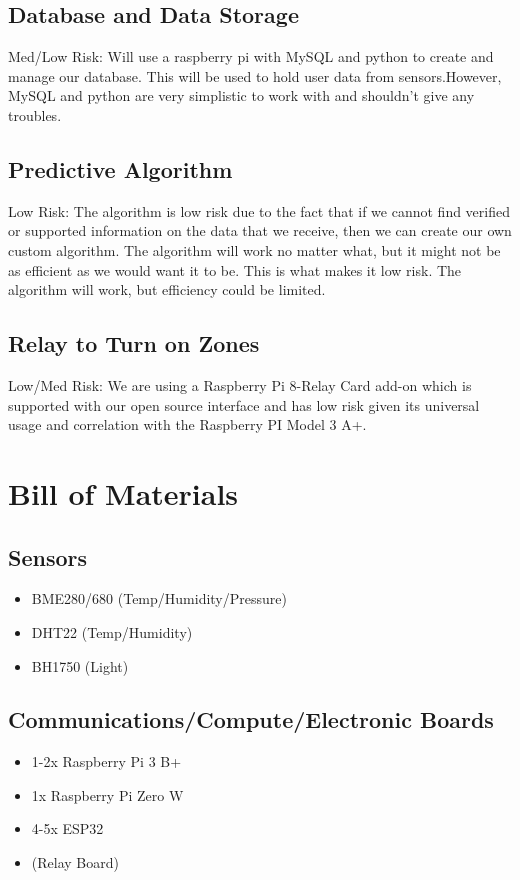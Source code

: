 \documentclass[letterpaper, 10 pt, conference]{ieeeconf}  %
\begin{document}
\subsection{Database and Data Storage}
Med/Low Risk: Will use a raspberry pi with MySQL and python to create and manage our database. This will be used to hold user data from sensors.However, MySQL and python are very simplistic to work with and shouldn't give any troubles.

\subsection{Predictive Algorithm}
Low Risk: The algorithm is low risk due to the fact that if we cannot find verified or supported information on the data that we receive, then we can create our own custom algorithm. The algorithm will work no matter what, but it might not be as efficient as we would want it to be. This is what makes it low risk. The algorithm will work, but efficiency could be limited.

\subsection{Relay to Turn on Zones}
Low/Med Risk: We are using a Raspberry Pi 8-Relay Card add-on which is supported with our open source interface and has low risk given its universal usage and correlation with the Raspberry PI Model 3 A+.

\section{Bill of Materials}
\subsection{Sensors}
\begin{itemize}
  \item BME280/680 (Temp/Humidity/Pressure)
  \item DHT22 (Temp/Humidity)
  \item BH1750 (Light)
\end{itemize}

\subsection{Communications/Compute/Electronic Boards}
\begin{itemize}
  \item 1-2x Raspberry Pi 3 B+
  \item 1x Raspberry Pi Zero W
  \item 4-5x ESP32
  \item (Relay Board)
\end{itemize}
\end{document}
